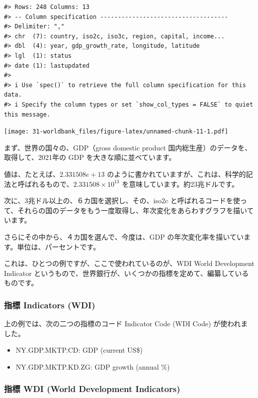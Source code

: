 \documentclass[
]{bxjsbook}
\providecommand{\tightlist}{%
  \setlength{\itemsep}{0pt}\setlength{\parskip}{0pt}}
\theoremstyle{definition}
\theoremstyle{definition}
\theoremstyle{definition}
\theoremstyle{definition}
\theoremstyle{remark}
\begin{document}
\begin{verbatim}
#> Rows: 248 Columns: 13
#> -- Column specification ------------------------------------
#> Delimiter: ","
#> chr  (7): country, iso2c, iso3c, region, capital, income...
#> dbl  (4): year, gdp_growth_rate, longitude, latitude
#> lgl  (1): status
#> date (1): lastupdated
#> 
#> i Use `spec()` to retrieve the full column specification for this data.
#> i Specify the column types or set `show_col_types = FALSE` to quiet this message.
\end{verbatim}

\texttt{[image: 31-worldbank\_files/figure-latex/unnamed-chunk-11-1.pdf]}

まず、世界の国々の、GDP（gross domestic product 国内総生産）のデータを、取得して、2021年の GDP を大きな順に並べています。

値は、たとえば、\(2.331508e+13\) のように書かれていますが、これは、科学的記法と呼ばれるもので、\(2.331508 \times 10^{13}\) を意味しています。約23兆ドルです。

次に、3兆ドル以上の、６カ国を選択し、その、iso2c と呼ばれるコードを使って、それらの国のデータをもう一度取得し、年次変化をあらわすグラフを描いています。

さらにその中から、４カ国を選んで、今度は、GDP の年次変化率を描いています。単位は、パーセントです。

これは、ひとつの例ですが、ここで使われているのが、WDI World Development Indicator というもので、世界銀行が、いくつかの指標を定めて、編纂しているものです。

\hypertarget{ux6307ux6a19-indicators-wdi}{%
\subsubsection{指標 Indicators (WDI)}\label{ux6307ux6a19-indicators-wdi}}

上の例では、次の二つの指標のコード Indicator Code (WDI Code) が使われました。

\begin{itemize}
\tightlist
\item
  NY.GDP.MKTP.CD: GDP (current US\$)
\item
  NY.GDP.MKTP.KD.ZG: GDP growth (annual \%)
\end{itemize}

\hypertarget{ux6307ux6a19-wdi-world-development-indicators}{%
\subsubsection{指標 WDI (World Development Indicators)}\label{ux6307ux6a19-wdi-world-development-indicators}}
\end{document}
